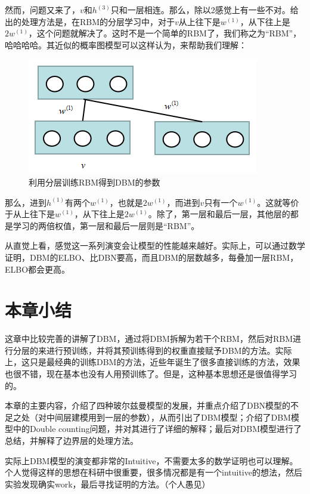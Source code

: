 \documentclass[a4paper]{article}
\begin{document}
然而，问题又来了，$v$和$h^{(3)}$只和一层相连。那么，除以2感觉上有一些不对。给出的处理方法是，在RBM的分层学习中，对于$v$从上往下是$w^{(1)}$，从下往上是$2w^{(1)}$，这个问题就解决了。这时不是一个简单的RBM了，我们称之为“RBM”，哈哈哈哈。其近似的概率图模型可以这样认为，来帮助我们理解：
\begin{figure}[H]
    \centering
    \includegraphics[width=.6\textwidth]{微信图片_20200523162935.png}
    \caption{利用分层训练RBM得到DBM的参数}
    \label{fig:my_label_1}
\end{figure}
那么，进到$h^{(1)}$有两个$w^{(1)}$，也就是$2w^{(1)}$，而进到$v$只有一个$w^{(1)}$。这就等价于从上往下是$w^{(1)}$，从下往上是$2w^{(1)}$。除了，第一层和最后一层，其他层的都是学习的两倍权值，第一层和最后一层则是“RBM”。

从直觉上看，感觉这一系列演变会让模型的性能越来越好。实际上，可以通过数学证明，DBM的ELBO、比DBN要高，而且DBM的层数越多，每叠加一层RBM，ELBO都会更高。

\section{本章小结}
这章中比较完善的讲解了DBM，通过将DBM拆解为若干个RBM，然后对RBM进行分层的来进行预训练，并将其预训练得到的权重直接赋予DBM的方法。实际上，这只是最经典的训练DBM的方法，近些年诞生了很多直接训练的方法，效果也很不错，现在基本也没有人用预训练了。但是，这种基本思想还是很值得学习的。

本章的主要内容，介绍了四种玻尔兹曼模型的发展，并重点介绍了DBN模型的不足之处（对中间层建模用到一层的参数），从而引出了DBM模型；介绍了DBM模型中的Double counting问题，并对其进行了详细的解释；最后对DBM模型进行了总结，并解释了边界层的处理方法。

实际上DBM模型的演变都非常的Intuitive，不需要太多的数学证明也可以理解。个人觉得这样的思想在科研中很重要，很多情况都是有一个intuitive的想法，然后实验发现确实work，最后寻找证明的方法。（个人愚见）
\end{document}
